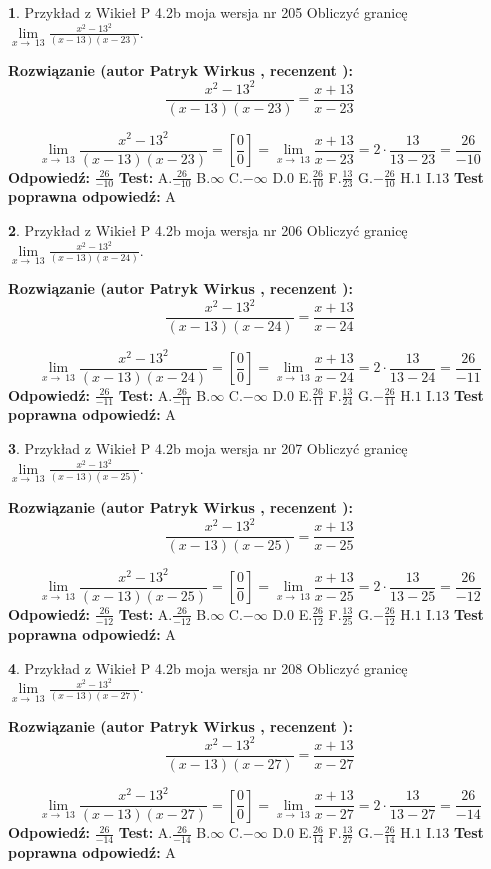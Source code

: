 \documentclass[12pt, a4paper]{article}
\theoremstyle{definition} %
\newtheorem{zad}{}
\newcommand{\zadStart}[1]{\begin{zad}#1\newline}
\newcommand{\zadStop}{\end{zad}}
\newcommand{\rozwStart}[2]{\noindent \textbf{Rozwiązanie (autor #1 , recenzent #2): }\newline}
\newcommand{\rozwStop}{\newline}
\newcommand{\odpStart}{\noindent \textbf{Odpowiedź:}\newline}
\newcommand{\odpStop}{\newline}
\newcommand{\testStart}{\noindent \textbf{Test:}\newline}
\newcommand{\testStop}{\newline}
\newcommand{\kluczStart}{\noindent \textbf{Test poprawna odpowiedź:}\newline}
\newcommand{\kluczStop}{\newline}
\begin{document}
\zadStart{Przykład z Wikieł P 4.2b moja wersja nr 205}
Obliczyć granicę $\lim\limits_{x\to\ 13}\frac{x^{2}-13^{2}}{(x-13)(x-23)}$.
\zadStop
\rozwStart{Patryk Wirkus}{}
$$\frac{x^{2}-13^{2}}{(x-13)(x-23)}=\frac{x+13}{x-23}$$

$$\lim\limits_{x\to\ 13}\frac{x^{2}-13^{2}}{(x-13)(x-23)}=[\frac{0}{0}]=\lim\limits_{x\to\ 13}\frac{x+13}{x-23}=2 \cdot \frac{13}{13-23} = \frac{26}{-10}$$
\rozwStop
\odpStart
$\frac{26}{-10}$
\odpStop
\testStart
A.$\frac{26}{-10}$
B.$\infty$
C.$-\infty$
D.$0$
E.$\frac{26}{10}$
F.$\frac{13}{23}$
G.$-\frac{26}{10}$
H.$1$
I.$13$
\testStop
\kluczStart
A
\kluczStop



\zadStart{Przykład z Wikieł P 4.2b moja wersja nr 206}
Obliczyć granicę $\lim\limits_{x\to\ 13}\frac{x^{2}-13^{2}}{(x-13)(x-24)}$.
\zadStop
\rozwStart{Patryk Wirkus}{}
$$\frac{x^{2}-13^{2}}{(x-13)(x-24)}=\frac{x+13}{x-24}$$

$$\lim\limits_{x\to\ 13}\frac{x^{2}-13^{2}}{(x-13)(x-24)}=[\frac{0}{0}]=\lim\limits_{x\to\ 13}\frac{x+13}{x-24}=2 \cdot \frac{13}{13-24} = \frac{26}{-11}$$
\rozwStop
\odpStart
$\frac{26}{-11}$
\odpStop
\testStart
A.$\frac{26}{-11}$
B.$\infty$
C.$-\infty$
D.$0$
E.$\frac{26}{11}$
F.$\frac{13}{24}$
G.$-\frac{26}{11}$
H.$1$
I.$13$
\testStop
\kluczStart
A
\kluczStop



\zadStart{Przykład z Wikieł P 4.2b moja wersja nr 207}
Obliczyć granicę $\lim\limits_{x\to\ 13}\frac{x^{2}-13^{2}}{(x-13)(x-25)}$.
\zadStop
\rozwStart{Patryk Wirkus}{}
$$\frac{x^{2}-13^{2}}{(x-13)(x-25)}=\frac{x+13}{x-25}$$

$$\lim\limits_{x\to\ 13}\frac{x^{2}-13^{2}}{(x-13)(x-25)}=[\frac{0}{0}]=\lim\limits_{x\to\ 13}\frac{x+13}{x-25}=2 \cdot \frac{13}{13-25} = \frac{26}{-12}$$
\rozwStop
\odpStart
$\frac{26}{-12}$
\odpStop
\testStart
A.$\frac{26}{-12}$
B.$\infty$
C.$-\infty$
D.$0$
E.$\frac{26}{12}$
F.$\frac{13}{25}$
G.$-\frac{26}{12}$
H.$1$
I.$13$
\testStop
\kluczStart
A
\kluczStop



\zadStart{Przykład z Wikieł P 4.2b moja wersja nr 208}
Obliczyć granicę $\lim\limits_{x\to\ 13}\frac{x^{2}-13^{2}}{(x-13)(x-27)}$.
\zadStop
\rozwStart{Patryk Wirkus}{}
$$\frac{x^{2}-13^{2}}{(x-13)(x-27)}=\frac{x+13}{x-27}$$

$$\lim\limits_{x\to\ 13}\frac{x^{2}-13^{2}}{(x-13)(x-27)}=[\frac{0}{0}]=\lim\limits_{x\to\ 13}\frac{x+13}{x-27}=2 \cdot \frac{13}{13-27} = \frac{26}{-14}$$
\rozwStop
\odpStart
$\frac{26}{-14}$
\odpStop
\testStart
A.$\frac{26}{-14}$
B.$\infty$
C.$-\infty$
D.$0$
E.$\frac{26}{14}$
F.$\frac{13}{27}$
G.$-\frac{26}{14}$
H.$1$
I.$13$
\testStop
\kluczStart
A
\kluczStop
\end{document}
